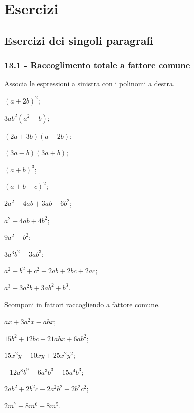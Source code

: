 \section{Esercizi}
\subsection{Esercizi dei singoli paragrafi}
\subsubsection*{13.1 - Raccoglimento totale a fattore comune}

\begin{esercizio}
\label{ese:13.1}
Associa le espressioni a sinistra con i polinomi a destra.
  \begin{multicols}{2}
\begin{enumeratea}
\item $(a+2b)^{2}$;
\item $3ab^{2}(a^{2}-b)$;
\item $(2a+3b)(a-2b)$;
\item $(3a-b)(3a+b)$;
\item $(a+b)^{3}$;
\item $(a+b+c)^{2}$;
\item $2a^{2}-4ab+3ab-6b^{2}$;
\item $a^{2}+4ab+4b^{2}$;
\item $9a^{2}-b^{2}$;
\item $3a^{3}b^{2}-3ab^{3}$;
\item $a^{2}+b^{2}+c^{2}+2ab+2bc+2ac$;
\item $a^{3}+3a^{2}b+3ab^{2}+b^{3}$.
\end{enumeratea}
  \end{multicols}
\end{esercizio}

\begin{esercizio}[\Ast]
\label{ese:13.2}
Scomponi in fattori raccogliendo a fattore comune.
\begin{multicols}{2}
\begin{enumeratea}
 \item $ax+3a^{2}x-abx$;
 \item $15b^{2}+12bc+21abx+6ab^{2}$;
 \item $15x^{2}y-10xy+25x^{2}y^{2}$;
 \item $-12a^{8}b^{9}-6a^{3}b^{3}-15a^{4}b^{3}$;
 \item $2ab^{2}+2b^{2}c-2a^{2}b^{2}-2b^{2}c^{2}$;
 \item $2m^{7}+8m^{6}+8m^{5}$.
\end{enumeratea}
\end{multicols}
\end{esercizio}

